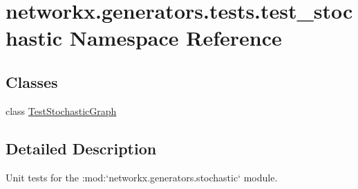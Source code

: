 \hypertarget{namespacenetworkx_1_1generators_1_1tests_1_1test__stochastic}{}\section{networkx.\+generators.\+tests.\+test\+\_\+stochastic Namespace Reference}
\label{namespacenetworkx_1_1generators_1_1tests_1_1test__stochastic}
\subsection*{Classes}
\begin{DoxyCompactItemize}
\item 
class \hyperlink{classnetworkx_1_1generators_1_1tests_1_1test__stochastic_1_1TestStochasticGraph}{Test\+Stochastic\+Graph}
\end{DoxyCompactItemize}


\subsection{Detailed Description}
\begin{DoxyVerb}Unit tests for the :mod:`networkx.generators.stochastic` module.\end{DoxyVerb}
 